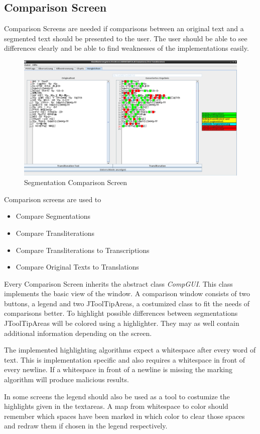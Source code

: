 \documentclass[10pt,a4paper,titlepage]{report}
\begin{document}
	\subsection{Comparison Screen}
	Comparison Screens are needed if comparisons between an original text and a segmented text should be presented to the user. The user should be able to see differences clearly and be able to find weaknesses of the implementations easily.\\
	\begin{figure}[htb]
		\centering
		\includegraphics[width=1\textwidth]{images/comp.png}
		\caption{Segmentation Comparison Screen}
		\label{fig:comp}
	\end{figure}
	Comparison screens are used to 
	\begin{itemize}
		\item Compare Segmentations
		\item Compare Transliterations
		\item Compare Transliterations to Transcriptions
		\item Compare Original Texts to Translations
	\end{itemize}
	Every Comparison Screen inherits the abstract class \textit{CompGUI}.  This class implements the basic view of the window. A comparison window consists of two buttons, a legend and two JToolTipAreas, a costumized class to fit the needs of comparisons better. To highlight possible differences between segmentations JToolTipAreas will be colored using a highlighter. They may as well contain additional information depending on the screen.
	\begin{tcolorbox}[title=Implementation Advice]
		The implemented highlighting algorithms expect a whitespace after every word of text. This is implementation specific and also requires a whitespace in front of every newline. If a whitespace in front of a newline is missing the marking algorithm will produce malicious results.
	\end{tcolorbox}
	In some screens the legend should also be used as a tool to costumize the highlights given in the textareas. A map from whitespace to color should remember which spaces have been marked in which color to clear those spaces and redraw them if chosen in the legend respectively.
\end{document}
